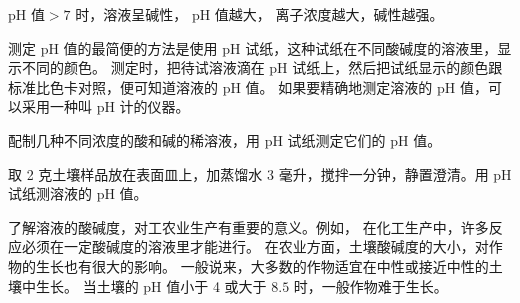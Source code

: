 $\text{pH 值} > 7$ 时，溶液呈碱性， pH 值越大， 离子浓度越大，碱性越强。

测定 pH 值的最简便的方法是使用 pH 试纸，这种试纸在不同酸碱度的溶液里，显示不同的颜色。
测定时，把待试溶液滴在 pH 试纸上，然后把试纸显示的颜色跟标准比色卡对照，便可知道溶液的 pH 值。
如果要精确地测定溶液的 pH 值，可以采用一种叫 pH 计的仪器。

\begin{shiyan}
    配制几种不同浓度的酸和碱的稀溶液，用 pH 试纸测定它们的 pH 值。
\end{shiyan}

\begin{shiyan}
    取 2 克土壤样品放在表面皿上，加蒸馏水 3 毫升，搅拌一分钟，静置澄清。用 pH 试纸测溶液的 pH 值。
\end{shiyan}

了解溶液的酸碱度，对工农业生产有重要的意义。例如，
在化工生产中，许多反应必须在一定酸碱度的溶液里才能进行。
在农业方面，土壤酸碱度的大小，对作物的生长也有很大的影响。
一般说来，大多数的作物适宜在中性或接近中性的土壤中生长。
当土壤的 pH 值小于 4 或大于 $8.5$ 时，一般作物难于生长。



\begin{xiti}







\end{xiti}


